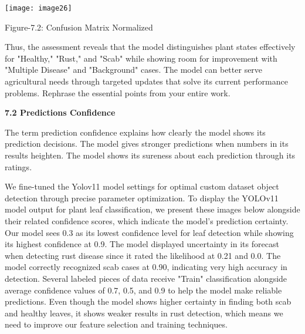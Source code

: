 \documentclass{book} %
\begin{document}
\noindent \texttt{[image: image26]}

\noindent 

\noindent 

\noindent 

\noindent 

\noindent 

\noindent 

\noindent  Figure-7.2:  Confusion Matrix Normalized 

\noindent Thus, the assessment reveals that the model distinguishes plant states effectively for "Healthy," "Rust," and "Scab" while showing room for improvement with "Multiple Disease" and "Background" cases. The model can better serve agricultural needs through targeted updates that solve its current performance problems. Rephrase the essential points from your entire work.

\noindent \eject \textbf{}

\noindent                 

\noindent \textbf{7.2 Predictions Confidence} 

\noindent The term prediction confidence explains how clearly the model shows its prediction decisions. The model gives stronger predictions when numbers in its results heighten. The model shows its sureness about each prediction through its ratings.

\noindent We fine-tuned the Yolov11 model settings for optimal custom dataset object detection through precise parameter optimization. To display the YOLOv11 model output for plant leaf classification, we present these images below alongside their related confidence scores, which indicate the model's prediction certainty. Our model sees 0.3 as its lowest confidence level for leaf detection while showing its highest confidence at 0.9. The model displayed uncertainty in its forecast when detecting rust disease since it rated the likelihood at 0.21 and 0.0. The model correctly recognized scab cases at 0.90, indicating very high accuracy in detection. Several labeled pieces of data receive "Train" classification alongside average confidence values of 0.7, 0.5, and 0.9 to help the model make reliable predictions. Even though the model shows higher certainty in finding both scab and healthy leaves, it shows weaker results in rust detection, which means we need to improve our feature selection and training techniques.

\noindent 

\noindent 
\end{document}
